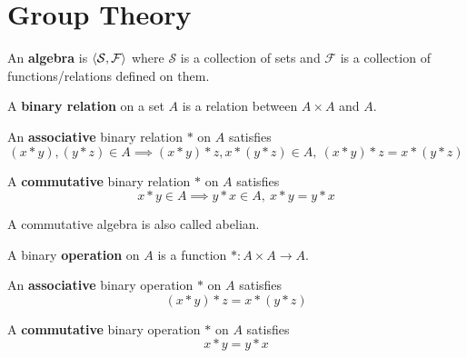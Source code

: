 \chapter{Group Theory}
\begin{definition}
	An \textbf{algebra} is $\left\langle \mathcal{S},\mathcal{F} \right\rangle$ where $\mathcal{S}$ is a collection of sets and $\mathcal{F}$ is a collection of functions/relations defined on them.
\end{definition}

\begin{definition}
	A \textbf{binary relation} on a set $A$ is a relation between $A \times A$ and $A$.
\end{definition}

\begin{definition}
	An \textbf{associative} binary relation $\ast$ on $A$ satisfies
	\begin{equation}
		(x \ast y),(y \ast z) \in A \implies (x \ast y) \ast z, x \ast (y \ast z) \in A,\ (x \ast y) \ast z = x \ast (y \ast z)
	\end{equation}
\end{definition}

\begin{definition}
	A \textbf{commutative} binary relation $\ast$ on $A$ satisfies
	\begin{equation}
		x \ast y \in A \implies y \ast x \in A,\ x \ast y = y \ast x
	\end{equation}
\end{definition}
	A commutative algebra is also called abelian.

\begin{definition}
	A binary \textbf{operation} on $A$ is a function $\ast : A \times A \to A$.
\end{definition}

\begin{definition}
	An \textbf{associative} binary operation $\ast$ on $A$ satisfies
	\begin{equation}
		(x \ast y) \ast z = x \ast (y \ast z)
	\end{equation}
\end{definition}

\begin{definition}
	A \textbf{commutative} binary operation $\ast$ on $A$ satisfies
	\begin{equation}
		x \ast y = y \ast x
	\end{equation}
\end{definition}

